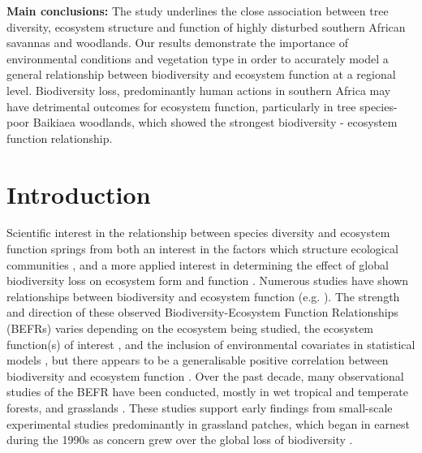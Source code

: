 \documentclass[11pt,a4paper]{article}
\begin{document}
\textbf{Main conclusions:} The study underlines the close association between tree diversity, ecosystem structure and  function of highly disturbed southern African savannas and woodlands. Our results demonstrate the importance of  environmental conditions and vegetation type in order to accurately model a general relationship between biodiversity and ecosystem function at a regional level. Biodiversity loss, predominantly  human actions in southern Africa may have detrimental outcomes for ecosystem function, particularly in tree species-poor Baikiaea woodlands, which showed the strongest biodiversity - ecosystem function relationship.


\section{Introduction}

Scientific interest in the relationship between species diversity and ecosystem function springs from both an interest in the factors which structure ecological communities \citep{}, and a more applied interest in determining the effect of global biodiversity loss on ecosystem form and function \citep{}. Numerous studies have shown relationships between biodiversity and ecosystem function (e.g. \citealt{Liang2016, Hooper2012, Cardinale2009}). The strength and direction of these observed Biodiversity-Ecosystem Function Relationships (BEFRs) varies depending on the ecosystem being studied, the ecosystem function(s) of interest \citep{Hector2007}, and the inclusion of environmental covariates in statistical models \citep{Vila2005}, but there appears to be a generalisable positive correlation between biodiversity and ecosystem function \citep{Liang2016}. Over the past decade, many observational studies of the BEFR have been conducted, mostly in wet tropical and temperate forests, and grasslands \citep{Chen2011}. These studies support early findings from small-scale experimental studies  predominantly in grassland patches, which began in earnest during the 1990s as concern grew over the global loss of biodiversity \citep{Tilman1994, Tilman2014}.
\end{document}
